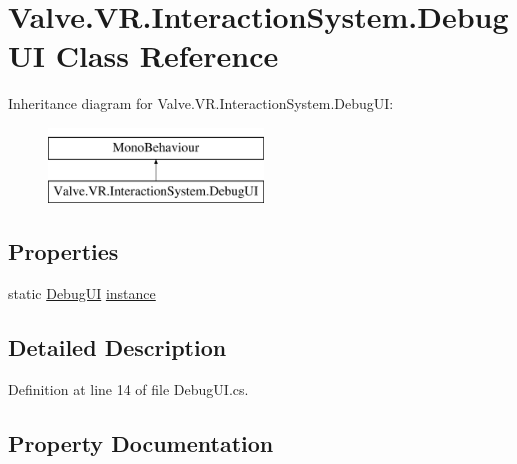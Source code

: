 \hypertarget{class_valve_1_1_v_r_1_1_interaction_system_1_1_debug_u_i}{}\section{Valve.\+V\+R.\+Interaction\+System.\+Debug\+UI Class Reference}
\label{class_valve_1_1_v_r_1_1_interaction_system_1_1_debug_u_i}
Inheritance diagram for Valve.\+V\+R.\+Interaction\+System.\+Debug\+UI\+:\begin{figure}[H]
\begin{center}
\leavevmode
\includegraphics[height=2.000000cm]{class_valve_1_1_v_r_1_1_interaction_system_1_1_debug_u_i}
\end{center}
\end{figure}
\subsection*{Properties}
\begin{DoxyCompactItemize}
\item 
static \mbox{\hyperlink{class_valve_1_1_v_r_1_1_interaction_system_1_1_debug_u_i}{Debug\+UI}} \mbox{\hyperlink{class_valve_1_1_v_r_1_1_interaction_system_1_1_debug_u_i_a167e4ec948450e25aa7bb89214b8d75e}{instance}}
\end{DoxyCompactItemize}


\subsection{Detailed Description}


Definition at line 14 of file Debug\+U\+I.\+cs.



\subsection{Property Documentation}
\mbox{\label{class_valve_1_1_v_r_1_1_interaction_system_1_1_debug_u_i_a167e4ec948450e25aa7bb89214b8d75e}} 
